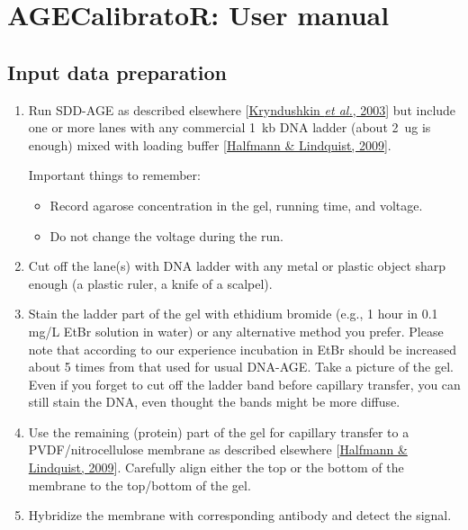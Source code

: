 \documentclass[11pt]{article}
\begin{document}
\section*{AGECalibratoR: User manual}

\subsection*{Input data preparation}

\begin{enumerate}

\item Run SDD-AGE as described elsewhere [\hyperlink{http://www.jbc.org/content/278/49/49636.full}{Kryndushkin \textit{et al.}, 2003}] but include one or more lanes with any commercial 1~kb DNA ladder (about 2~ug is enough) mixed with loading buffer [\hyperlink{dx.doi.org/10.3791/838}{Halfmann \& Lindquist, 2009}].

Important things to remember: 
\begin{itemize}
	\item Record agarose concentration in the gel, running time, and voltage.
	\item Do not change the voltage during the run.
\end{itemize}

\item Cut off the lane(s) with DNA ladder with any metal or plastic object sharp enough (a plastic ruler, a knife of a scalpel).

\item Stain the ladder part of the gel with ethidium bromide (e.g., 1 hour in 0.1 mg/L EtBr solution in water) or any alternative method you prefer. Please note that according to our experience incubation in EtBr should be increased about 5 times from that used for usual DNA-AGE. Take a picture of the gel. Even if you forget to cut off the ladder band before capillary transfer, you can still stain the DNA, even thought the bands might be more diffuse. 

\item Use the remaining (protein) part of the gel for capillary transfer to a PVDF/nitrocellulose membrane as described elsewhere [\hyperlink{dx.doi.org/10.3791/838}{Halfmann \& Lindquist, 2009}]. Carefully align either the top or the bottom of the membrane to the top/bottom of the gel.

\item Hybridize the membrane with corresponding antibody and detect the signal. 



\end{enumerate}
\end{document}
